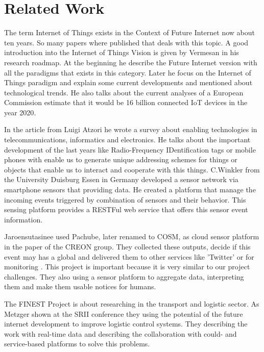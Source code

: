 \documentclass{acm_proc_article-sp}
\begin{document}
\section{Related Work}
\label{sec:Related Work}

The term Internet of Things exists in the Context of Future Internet now about ten years. 
So many papers where published that deals with this topic.
A good introduction into the Internet of Things Vision is given by Vermesan in his research roadmap. At the beginning he describe the Future Internet version with all the paradigms that exists in this category\cite{vermesan2009internet}. Later he focus on the Internet of Things paradigm and explain some current developments and mentioned about technological trends.
He also talks about the current analyses of a European Commission estimate that it would be 16 billion connected IoT devices in the year 2020\cite{sundmaeker2010vision}.

In the article from Luigi Atzori he wrote a survey about enabling technologies in telecommunications, informatics and electronics. He talks about the important development of the last years like Radio-Frequency IDentification tags or mobile phones with enable us to generate unique addressing schemes for things or objects that enable us to interact and cooperate with this things\cite{atzori2010internet}.
C.Winkler from the University Duisburg Essen in Germany developed a sensor network via smartphone sensors that providing data\cite{sense-sation_winkler}.
He created a platform that manage the incoming events triggered by combination of sensors and their behavior.
This sensing platform provides a RESTFul web service that offers this sensor event information.

Jaroensutasinee used Pachube, later renamed to COSM, as cloud sensor platform in the paper of the CREON group. They collected these outputs, decide if this event may has a global  and delivered them to other services like 'Twitter' or for monitoring \cite{jaroensutasineecreon}.
This project is important because it is very similar to our project challenges.
They also using a sensor platform to aggregate data, interpreting them and make them usable notices for humans.

The FINEST Project is about researching in the transport and logistic sector. As Metzger shown at the SRII conference they using the potential of the future internet development to improve logistic control systems. They describing the work with real-time data and describing the collaboration with could- and service-based platforms to solve this problems. \cite{metzger2012predictive}
\end{document}
